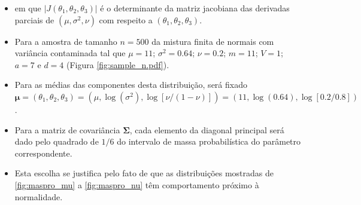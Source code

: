 \documentclass[9pt]{beamer}
\begin{document}
\begin{frame}
\begin{itemize}
\justifying	
\item em que $|J(\theta_1, \theta_2, \theta_3)|$ é o determinante da matriz jacobiana das derivadas parciais de $(\mu, \sigma^2, \nu)$ com respeito a $(\theta_1, \theta_2, \theta_3)$.
\item Para a amostra de tamanho $n=500$ da mistura finita de normais com variância contaminada tal que $\mu = 11$; $\sigma^2 = 0.64$; $\nu = 0.2$; $m = 11$; $V = 1$; $a = 7$ e $d = 4$ (Figura \ref{fig:sample_n.pdf}).

\item Para as médias das componentes desta distribuição, será fixado $\bm{\mu} = (\theta_1, \theta_2, \theta_3) = (\mu, \log(\sigma^2), \log[\nu/(1-\nu)]) = (11, \log(0.64), \log[0.2/0.8])$.
\item Para a matriz de covariância $\bm{\Sigma}$, cada elemento da diagonal principal será dado pelo quadrado de $1/6$ do intervalo de massa probabilística do parâmetro correspondente.

\item Esta escolha se justifica pelo fato de que as distribuições mostradas de \ref{fig:maspro_mu} a \ref{fig:maspro_nu} têm comportamento próximo à normalidade.
\end{itemize}
\end{frame}
\end{document}
